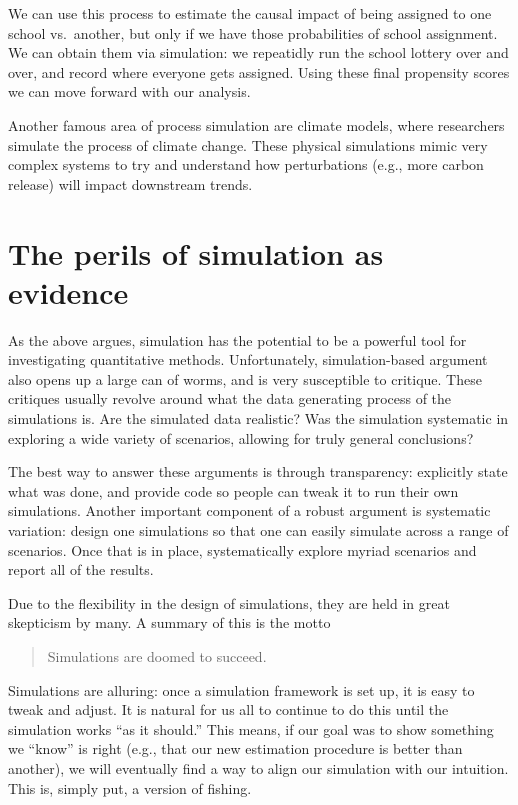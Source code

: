 \documentclass[
]{book}
\begin{document}
We can use this process to estimate the causal impact of being assigned to one school vs.~another, but only if we have those probabilities of school assignment.
We can obtain them via simulation: we repeatidly run the school lottery over and over, and record where everyone gets assigned.
Using these final propensity scores we can move forward with our analysis.

Another famous area of process simulation are climate models, where researchers simulate the process of climate change.
These physical simulations mimic very complex systems to try and understand how perturbations (e.g., more carbon release) will impact downstream trends.

\hypertarget{the-perils-of-simulation-as-evidence}{%
\section{The perils of simulation as evidence}\label{the-perils-of-simulation-as-evidence}}

As the above argues, simulation has the potential to be a powerful tool for investigating quantitative methods.
Unfortunately, simulation-based argument also opens up a large can of worms, and is very susceptible to critique.
These critiques usually revolve around what the data generating process of the simulations is.
Are the simulated data realistic?
Was the simulation systematic in exploring a wide variety of scenarios, allowing for truly general conclusions?

The best way to answer these arguments is through transparency: explicitly state what was done, and provide code so people can tweak it to run their own simulations.
Another important component of a robust argument is systematic variation: design one simulations so that one can easily simulate across a range of scenarios.
Once that is in place, systematically explore myriad scenarios and report all of the results.

Due to the flexibility in the design of simulations, they are held in great skepticism by many.
A summary of this is the motto

\begin{quote}
Simulations are doomed to succeed.
\end{quote}

Simulations are alluring: once a simulation framework is set up, it is easy to tweak and adjust.
It is natural for us all to continue to do this until the simulation works ``as it should.''
This means, if our goal was to show something we ``know'' is right (e.g., that our new estimation procedure is better than another), we will eventually find a way to align our simulation with our intuition.
This is, simply put, a version of fishing.
\end{document}
